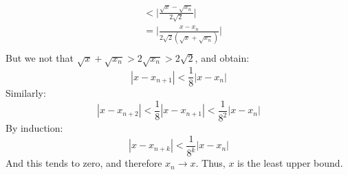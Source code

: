\begin{lexample}
\begin{align}
                    &<\Big|\frac{\sqrt{x}-\sqrt{x_{n}}}{2\sqrt{2}}
                        \Big|\\
                    &=\Big|\frac{x-x_{n}}
                        {2\sqrt{2}(\sqrt{x}+\sqrt{x_{n}})}\Big|\\
                \end{align}
                But we not that
                $\sqrt{x}+\sqrt{x_{n}}>2\sqrt{x_{n}}>2\sqrt{2}$,
                and obtain:
                \begin{equation}
                    |x-x_{n+1}|<\frac{1}{8}|x-x_{n}|
                \end{equation}
                Similarly:
                \begin{equation}
                    |x-x_{n+2}|<\frac{1}{8}|x-x_{n+1}|<
                    \frac{1}{8^{2}}|x-x_{n}|
                \end{equation}
                By induction:
                \begin{equation}
                    |x-x_{n+k}|<\frac{1}{8^{k}}|x-x_{n}|
                \end{equation}
                And this tends to zero, and therefore
                $x_{n}\rightarrow{x}$. Thus, $x$ is the least
                upper bound.
            \end{lexample}
